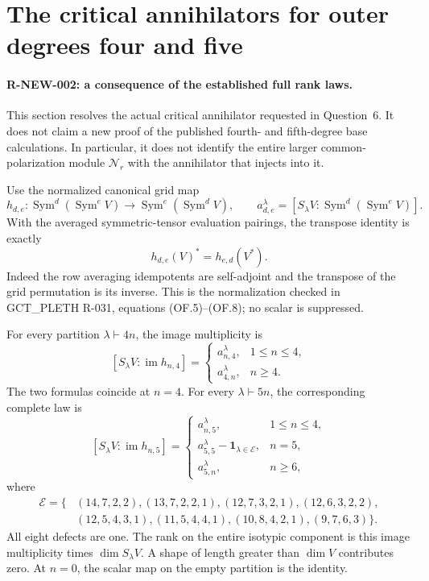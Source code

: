 \section{The critical annihilators for outer degrees four and five}
\label{sec:canonical-rank-laws}

\paragraph{R-NEW-002: a consequence of the established full rank laws.}
This section resolves the actual critical annihilator requested in
Question~6. It does not claim a new proof of the published fourth- and
fifth-degree base calculations. In particular, it does not identify the
entire larger common-polarization module $\mathcal N_r$ with the
annihilator that injects into it.

Use the normalized canonical grid map
\[
 h_{d,e}:\operatorname{Sym}^{d}(\operatorname{Sym}^{e}V)
       \longrightarrow\operatorname{Sym}^{e}(\operatorname{Sym}^{d}V),
 \qquad
 a_{d,e}^{\lambda}=[S_\lambda V:
             \operatorname{Sym}^{d}(\operatorname{Sym}^{e}V)].
\]
With the averaged symmetric-tensor evaluation pairings, the transpose
identity is exactly
\[
                  h_{d,e}(V)^*=h_{e,d}(V^*).
 \tag{R-NEW-2a}
\]
Indeed the row averaging idempotents are self-adjoint and the transpose
of the grid permutation is its inverse. This is the normalization
checked in GCT\_PLETH R-031, equations (OF.5)--(OF.8); no scalar is
suppressed.

For every partition $\lambda\vdash4n$, the image multiplicity is
\[
 [S_\lambda V:\operatorname{im}h_{n,4}]=
 \begin{cases}
 a_{n,4}^{\lambda},&1\le n\le4,\\
 a_{4,n}^{\lambda},&n\ge4.
 \end{cases}
 \tag{R-NEW-2b}
\]
The two formulas coincide at $n=4$. For every
$\lambda\vdash5n$, the corresponding complete law is
\[
 [S_\lambda V:\operatorname{im}h_{n,5}]=
 \begin{cases}
 a_{n,5}^{\lambda},&1\le n\le4,\\
 a_{5,5}^{\lambda}-\mathbf1_{\lambda\in\mathcal E},&n=5,\\
 a_{5,n}^{\lambda},&n\ge6,
 \end{cases}
 \tag{R-NEW-2c}
\]
where
\[
\begin{split}
\mathcal E=\{&(14,7,2,2),(13,7,2,2,1),(12,7,3,2,1),
 (12,6,3,2,2),\\
 &(12,5,4,3,1),(11,5,4,4,1),(10,8,4,2,1),(9,7,6,3)\}.
\end{split}
\]
All eight defects are one. The rank on the entire isotypic component
is this image multiplicity times $\dim S_\lambda V$. A shape of length
greater than $\dim V$ contributes zero. At $n=0$, the scalar map on
the empty partition is the identity.

